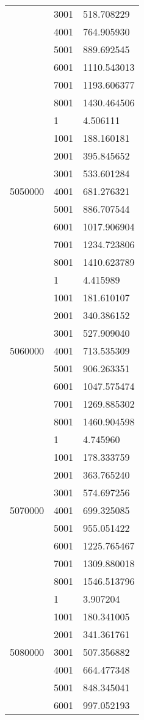 \begin{table}[htb!]
\begin{tabular}{lll}
 & 3001 & 518.708229 \\
 & 4001 & 764.905930 \\
 & 5001 & 889.692545 \\
 & 6001 & 1110.543013 \\
 & 7001 & 1193.606377 \\
 & 8001 & 1430.464506 \\
\multirow[c]{9}{*}{5050000} & 1 & 4.506111 \\
 & 1001 & 188.160181 \\
 & 2001 & 395.845652 \\
 & 3001 & 533.601284 \\
 & 4001 & 681.276321 \\
 & 5001 & 886.707544 \\
 & 6001 & 1017.906904 \\
 & 7001 & 1234.723806 \\
 & 8001 & 1410.623789 \\
\multirow[c]{9}{*}{5060000} & 1 & 4.415989 \\
 & 1001 & 181.610107 \\
 & 2001 & 340.386152 \\
 & 3001 & 527.909040 \\
 & 4001 & 713.535309 \\
 & 5001 & 906.263351 \\
 & 6001 & 1047.575474 \\
 & 7001 & 1269.885302 \\
 & 8001 & 1460.904598 \\
\multirow[c]{9}{*}{5070000} & 1 & 4.745960 \\
 & 1001 & 178.333759 \\
 & 2001 & 363.765240 \\
 & 3001 & 574.697256 \\
 & 4001 & 699.325085 \\
 & 5001 & 955.051422 \\
 & 6001 & 1225.765467 \\
 & 7001 & 1309.880018 \\
 & 8001 & 1546.513796 \\
\multirow[c]{9}{*}{5080000} & 1 & 3.907204 \\
 & 1001 & 180.341005 \\
 & 2001 & 341.361761 \\
 & 3001 & 507.356882 \\
 & 4001 & 664.477348 \\
 & 5001 & 848.345041 \\
 & 6001 & 997.052193 \\

\end{tabular}
\end{table}

